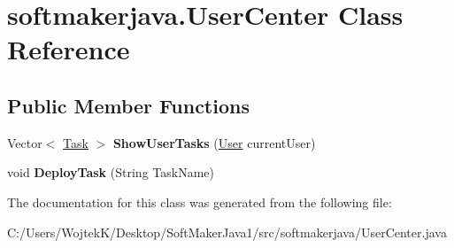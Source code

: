 \hypertarget{classsoftmakerjava_1_1_user_center}{}\section{softmakerjava.\+User\+Center Class Reference}
\label{classsoftmakerjava_1_1_user_center}
\subsection*{Public Member Functions}
\begin{DoxyCompactItemize}
\item 
Vector$<$ \hyperlink{classsoftmakerjava_1_1_task}{Task} $>$ {\bfseries Show\+User\+Tasks} (\hyperlink{classsoftmakerjava_1_1_user}{User} current\+User)\hypertarget{classsoftmakerjava_1_1_user_center_a4fd011aae2210dc1b39397590e7134c9}{}\label{classsoftmakerjava_1_1_user_center_a4fd011aae2210dc1b39397590e7134c9}

\item 
void {\bfseries Deploy\+Task} (String Task\+Name)\hypertarget{classsoftmakerjava_1_1_user_center_a661950f4f0e212a003a4a37ee0363d30}{}\label{classsoftmakerjava_1_1_user_center_a661950f4f0e212a003a4a37ee0363d30}

\end{DoxyCompactItemize}


The documentation for this class was generated from the following file\+:\begin{DoxyCompactItemize}
\item 
C\+:/\+Users/\+Wojtek\+K/\+Desktop/\+Soft\+Maker\+Java1/src/softmakerjava/User\+Center.\+java\end{DoxyCompactItemize}
